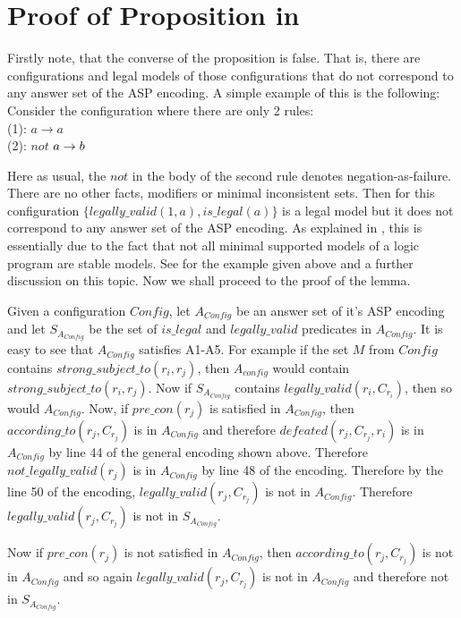 \section{Proof of Proposition in \secref{}}\label{sec:proofs}

Firstly note, that the converse of the proposition is false. That is, there are configurations and legal models of those configurations that do not correspond to any answer set of the ASP encoding. A simple example of this is the following: Consider the configuration where there are only 2 rules:\\ (1): $a\rightarrow a$\\
(2): $not$ $a\rightarrow b\\$

Here as usual, the $not$ in the body of the second rule denotes negation-as-failure. There are no other facts, modifiers or minimal inconsistent sets. Then for this configuration $\{legally\_valid(1,a), is\_legal(a)\}$ is a legal model but it does not correspond to any answer set of the ASP encoding. As explained in \citep{KRR_notes}, this is essentially due to the fact that not all minimal supported models of a logic program are stable models. See \citep{KRR_notes} for the example given above and a further discussion on this topic.  Now we shall proceed to the proof of the lemma.

Given a configuration $Config$, let $A_{Config}$ be an answer set of it's ASP encoding and let $S_{A_{Config}}$ be the set of $is\_legal$ and $legally\_valid$ predicates in $A_{Config}$. It is easy to see that $A_{Config}$ satisfies A1-A5. For example if the set $M$ from $Config$ contains $strong\_subject\_to(r_{i}, r_{j})$, then $A_{config}$ would contain $strong\_subject\_to(r_{i}, r_{j})$. Now if $S_{A_{Config}}$ contains $legally\_valid(r_{i}, C_{r_{i}})$, then so would $A_{Config}$. Now, if $pre\_con(r_{j})$ is satisfied in $A_{Config}$, then $according\_to(r_{j},C_{r_{j}})$ is in $A_{Config}$ and therefore $defeated(r_{j}, C_{r_{j}}, r_{i})$ is in $A_{Config}$ by line 44 of the general encoding shown above. Therefore $not\_legally\_valid(r_{j})$ is in $A_{Config}$ by line 48 of the encoding. Therefore by the line 50 of the encoding, $legally\_valid(r_{j},C_{r_{j}})$ is not in $A_{Config}$. Therefore $legally\_valid(r_{j},C_{r_{j}})$ is not in $S_{A_{Config}}$.

Now if $pre\_con(r_{j})$ is not satisfied in $A_{Config}$, then $according\_to(r_{j},C_{r_{j}})$ is not in $A_{Config}$ and so again $legally\_valid(r_{j},C_{r_{j}})$ is not in $A_{Config}$ and therefore not in $S_{A_{Config}}$.

